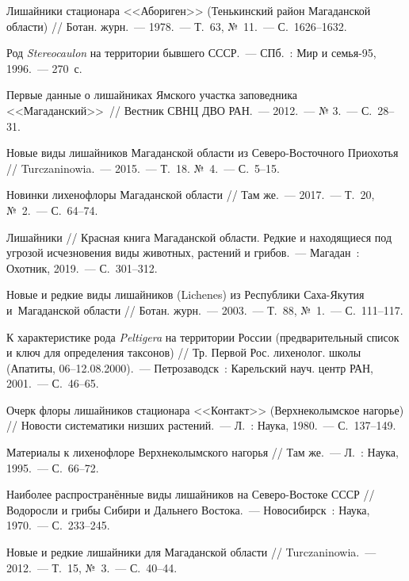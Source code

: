 \begin{thebibliography}{99}
\bibitem{} Лишайники стационара <<Абориген>> (Тенькинский район Магаданской области) // Ботан. журн.~--- 1978.~--- Т.~63, №~11.~--- С.~1626--1632.

\bibitem{} Род \textit{Stereocaulon} на территории бывшего СССР.~--- СПб.~: Мир и семья-95, 1996.~--- 270~с.

\bibitem{} Первые данные о лишайниках Ямского участка заповедника <<Магаданский>>~// Вестник СВНЦ ДВО РАН.~--- 2012.~--- № 3.~--- С.~28--31.

\bibitem{} Новые виды лишайников Магаданской области из Северо-Восточного Приохотья // Turczaninowia.~--- 2015.~--- Т.~18. №~4.~--- С.~5--15.

\bibitem{} Новинки лихенофлоры Магаданской области // Там же.~--- 2017.~--- Т.~20, №~2.~--- С.~64--74.

\bibitem{} Лишайники // Красная книга Магаданской области. Редкие и находящиеся под угрозой исчезновения виды животных, растений и грибов.~--- Магадан~: Охотник, 2019.~--- С.~301--312.

\bibitem{} Новые и редкие виды лишайников (Lichenes) из Республики Саха-Якутия и~Магаданской области // Ботан. журн.~--- 2003.~--- Т.~88, №~1.~--- С.~111--117.

\bibitem{} К характеристике рода \textit{Peltigera} на территории России (предварительный список и ключ для определения таксонов) // Тр. Первой Рос. лихенолог. школы (Апатиты, 06–12.08.2000).~--- Петрозаводск~: Карельский науч. центр РАН, 2001.~--- С.~46--65.

\bibitem{} Очерк флоры лишайников стационара <<Контакт>> (Верхнеколымское нагорье) // Новости систематики низших растений.~--- Л.~: Наука, 1980.~--- С.~137--149.

\bibitem{} Материалы к лихенофлоре Верхнеколымского нагорья // Там же.~--- Л.~: Наука, 1995.~--- С.~66--72.

\bibitem{} Наиболее распространённые виды лишайников на Северо-Востоке СССР // Водоросли и грибы Сибири и Дальнего Востока.~--- Новосибирск~: Наука, 1970.~--- С.~233--245.

\bibitem{} Новые и редкие лишайники для Магаданской области // Turczaninowia.~--- 2012.~--- Т.~15, №~3.~--- С.~40--44.


\end{thebibliography}
